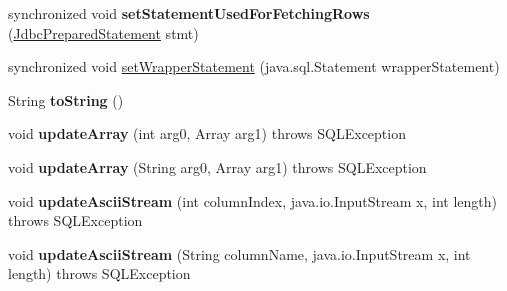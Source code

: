 \begin{DoxyCompactItemize}
\mbox{\label{classcom_1_1mysql_1_1cj_1_1jdbc_1_1result_1_1_result_set_impl_a170b3778d3020705fa199ef38b1722cc}} 
synchronized void {\bfseries set\+Statement\+Used\+For\+Fetching\+Rows} (\mbox{\hyperlink{interfacecom_1_1mysql_1_1cj_1_1jdbc_1_1_jdbc_prepared_statement}{Jdbc\+Prepared\+Statement}} stmt)
\item 
synchronized void \mbox{\hyperlink{classcom_1_1mysql_1_1cj_1_1jdbc_1_1result_1_1_result_set_impl_a554db0f910df92f690ce667a5e5b5000}{set\+Wrapper\+Statement}} (java.\+sql.\+Statement wrapper\+Statement)
\item 
\mbox{\label{classcom_1_1mysql_1_1cj_1_1jdbc_1_1result_1_1_result_set_impl_aaa10d9fc724924fcd9513723c7e6d6bb}} 
String {\bfseries to\+String} ()
\item 
\mbox{\label{classcom_1_1mysql_1_1cj_1_1jdbc_1_1result_1_1_result_set_impl_a9b12012c80e02d4cde1c6d6a9f46e657}} 
void {\bfseries update\+Array} (int arg0, Array arg1)  throws S\+Q\+L\+Exception 
\item 
\mbox{\label{classcom_1_1mysql_1_1cj_1_1jdbc_1_1result_1_1_result_set_impl_afa6e878d6b4247d8c90709484dde12d3}} 
void {\bfseries update\+Array} (String arg0, Array arg1)  throws S\+Q\+L\+Exception 
\item 
\mbox{\label{classcom_1_1mysql_1_1cj_1_1jdbc_1_1result_1_1_result_set_impl_ab949c42ad9eb38d42f8ef8cb36c6cc72}} 
void {\bfseries update\+Ascii\+Stream} (int column\+Index, java.\+io.\+Input\+Stream x, int length)  throws S\+Q\+L\+Exception 
\item 
\mbox{\label{classcom_1_1mysql_1_1cj_1_1jdbc_1_1result_1_1_result_set_impl_a35f527dc125f0fc7e781331c7e1998b9}} 
void {\bfseries update\+Ascii\+Stream} (String column\+Name, java.\+io.\+Input\+Stream x, int length)  throws S\+Q\+L\+Exception 
\item 
\mbox{\label{classcom_1_1mysql_1_1cj_1_1jdbc_1_1result_1_1_result_set_impl_a51f8b2fd0f03408a69c2f7202dd6c32b}} 

\end{DoxyCompactItemize}
